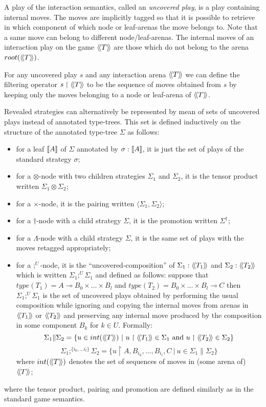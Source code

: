 A play of the interaction semantics, called an \emph{uncovered
play}, is a play containing internal moves.
The moves are implicitly tagged so that it is possible to retrieve in which component
of which node or leaf-arenas the move belongs to. Note that a same move can belong to different node/leaf-arenas.
The internal moves of an interaction play on the game ${\langle\!\langle T \rangle\!\rangle}$ are those which do not
belong to the arena $root({\langle\!\langle T \rangle\!\rangle})$.

For any uncovered play $s$ and any interaction arena ${\langle\!\langle T \rangle\!\rangle}$
we can define the filtering operator $s\upharpoonright {\langle\!\langle T \rangle\!\rangle}$ to be the
sequence of moves obtained from $s$ by keeping only the moves
belonging to a node or leaf-arena of ${\langle\!\langle T \rangle\!\rangle}$.


Revealed strategies can alternatively be represented by mean of sets
of uncovered plays instead of annotated type-trees. This set is
defined inductively on the structure of the annotated type-tree
$\Sigma$ as follows:
\begin{itemize}
\item for a leaf ${[\![ A ]\!]}$ of $\Sigma$ annotated by $\sigma :{[\![ A ]\!]}$, it is just the set of plays of the standard strategy $\sigma$;
\item for a $\otimes$-node with two children strategies $\Sigma_1$ and $\Sigma_2$, it is the tensor product written $\Sigma_1 \otimes \Sigma_2$;
\item for a $\times$-node, it is the pairing written $\langle \Sigma_1, \Sigma_2 \rangle$;
\item for a $\dagger$-node with a child strategy $\Sigma$, it is the promotion written $\Sigma^\dagger$;
\item for a $\Lambda$-node with a child strategy $\Sigma$, it is the same set of plays with the moves retagged appropriately;

\item for a $;^U$-node, it is the ``uncovered-composition'' of $\Sigma_1 : {\langle\!\langle T_1 \rangle\!\rangle}$ and $\Sigma_2 :{\langle\!\langle T_2 \rangle\!\rangle}$ which is written $\Sigma_1
;^U \Sigma_1$ and defined as follows: suppose that $type(T_1) = A
\multimap B_0 \times \ldots \times B_l$ and $type(T_2) = B_0 \times
\ldots \times B_l \multimap C$ then $\Sigma_1 ;^U \Sigma_1$ is the
set of uncovered plays obtained by performing the usual composition
while ignoring and copying the internal moves from arenas in
${\langle\!\langle T_1 \rangle\!\rangle}$ or ${\langle\!\langle T_2 \rangle\!\rangle}$ and preserving any internal
move produced by the composition in some component $B_k$ for $k \in
U$. Formally:
$$ \Sigma_1 \| \Sigma_2 = \{ u \in int({\langle\!\langle T \rangle\!\rangle}) \ | \ u \upharpoonright {\langle\!\langle T_1 \rangle\!\rangle} \in \Sigma_1 \mbox{ and } u \upharpoonright {\langle\!\langle T_2 \rangle\!\rangle} \in \Sigma_2 \}$$
$$ \Sigma_1 ;^{\{i_0, \ldots i_l\}} \Sigma_2 = \{ u \upharpoonright A, B_{i_0}, \ldots, B_{i_l}, C \ | \ u \in \Sigma_1 \| \Sigma_2 \}$$
where $int({\langle\!\langle T \rangle\!\rangle})$ denotes the set of sequences of moves in (some arena of) ${\langle\!\langle T \rangle\!\rangle}$;
\end{itemize}
where the tensor product, pairing and promotion are defined similarly as in the standard game semantics.



